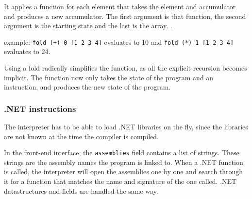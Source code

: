 It applies a function for each element that takes the element and accumulator and produces a new accumulator.
The first argument is that function, the second argument is the starting state and the last is the array.
\cite{realworldhaskellch4}.

example: \texttt{fold (+) 0 [1 2 3 4]} evaluates to 10 and \texttt{fold (*) 1 [1 2 3 4]} evaluates to 24.

Using a fold radically simplifies the function, as all the explicit recursion becomes implicit.
The function now only takes the state of the program and an instruction, and produces the new state of the program.

\subsubsection{.NET instructions}
The interpreter has to be able to load .NET libraries on the fly, since the libraries are not known at the time the compiler is compiled.

In the front-end interface, the \verb|assemblies| field contains a list of strings.
These strings are the assembly names the program is linked to.
When a .NET function is called, the interpreter will open the assemblies one by one and search through it for a function that matches the name and signature of the one called.
.NET datastructures and fields are handled the same way.

